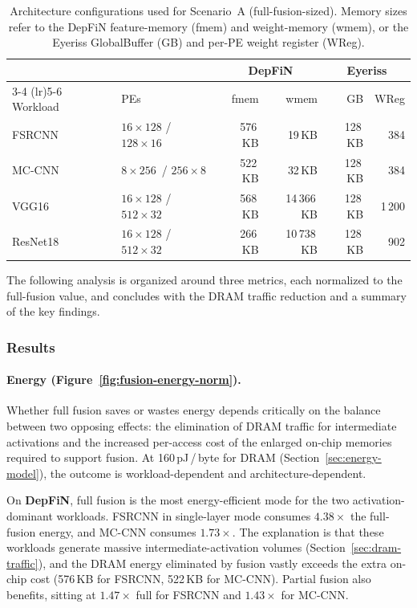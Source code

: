 \begin{table}[htbp]
  \centering
  \caption{Architecture configurations used for Scenario~A
    (full-fusion-sized).
    Memory sizes refer to the DepFiN feature-memory (fmem) and
    weight-memory (wmem), or the Eyeriss GlobalBuffer (GB) and
    per-PE weight register (WReg).}
  \label{tab:fusion-auto-configs}
  \begin{tabular}{ll rr rr}
    \toprule
    & & \multicolumn{2}{c}{DepFiN} & \multicolumn{2}{c}{Eyeriss} \\
    \cmidrule(lr){3-4} \cmidrule(lr){5-6}
    Workload & PEs
      & fmem & wmem
      & GB & WReg \\
    \midrule
    FSRCNN   & $16 \times 128$ / $128 \times 16$
      & 576\,KB  & 19\,KB
      & 128\,KB  & 384 \\
    MC-CNN   & $8 \times 256$\, / $256 \times 8$
      & 522\,KB  & 32\,KB
      & 128\,KB  & 384 \\
    VGG16    & $16 \times 128$ / $512 \times 32$
      & 568\,KB  & 14\,366\,KB
      & 128\,KB  & 1\,200 \\
    ResNet18 & $16 \times 128$ / $512 \times 32$
      & 266\,KB  & 10\,738\,KB
      & 128\,KB  & 902 \\
    \bottomrule
  \end{tabular}
\end{table}

The following analysis is organized around three metrics, each
normalized to the full-fusion value, and concludes with the
DRAM traffic reduction and a summary of the key findings.

\subsubsection{Results}

\paragraph{Energy (Figure~\ref{fig:fusion-energy-norm}).}
Whether full fusion saves or wastes energy depends critically on
the balance between two opposing effects: the elimination of DRAM
traffic for intermediate activations and the increased per-access
cost of the enlarged on-chip memories required to support fusion.
At 160\,pJ\,/\,byte for DRAM
(Section~\ref{sec:energy-model}), the outcome is
workload-dependent and architecture-dependent.

On \textbf{DepFiN}, full fusion is the most energy-efficient mode
for the two activation-dominant workloads.
FSRCNN in single-layer mode consumes $4.38\times$ the full-fusion
energy, and MC-CNN consumes $1.73\times$.
The explanation is that these workloads generate massive
intermediate-activation volumes (Section~\ref{sec:dram-traffic}),
and the DRAM energy eliminated by fusion
vastly exceeds the extra on-chip cost (576\,KB for FSRCNN, 522\,KB for MC-CNN).
Partial fusion also benefits, sitting at $1.47\times$ full for
FSRCNN and $1.43\times$ for MC-CNN.

